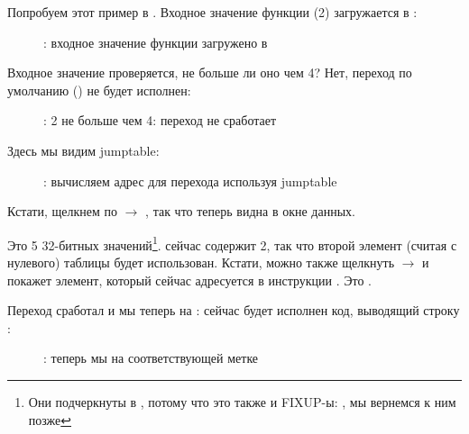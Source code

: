 ﻿\clearpage
\mysubparagraph{\olly}
\myindex{\olly}

Попробуем этот пример в \olly.
Входное значение функции (2) загружается в \EAX: 

\begin{figure}[H]
\centering
{}
\caption{\olly: входное значение функции загружено в \EAX}
\label{fig:switch_lot_olly1}
\end{figure}

\clearpage
Входное значение проверяется, не больше ли оно чем 4? 
Нет, переход по умолчанию () не будет исполнен:

\begin{figure}[H]
\centering
{}
\caption{\olly: 2 не больше чем 4: переход не сработает}
\label{fig:switch_lot_olly2}
\end{figure}

\clearpage
Здесь мы видим jumptable:

\begin{figure}[H]
\centering
{}
\caption{\olly: вычисляем адрес для перехода используя jumptable}
\label{fig:switch_lot_olly3}
\end{figure}

Кстати, щелкнем по  $\rightarrow$ , так что теперь  видна в окне данных.

Это 5 32-битных значений\footnote{Они подчеркнуты в \olly, потому что это также и FIXUP-ы: , мы вернемся к ним позже}.
\ECX сейчас содержит 2, так что второй элемент (считая с нулевого) таблицы будет использован.
Кстати, можно также щелкнуть  $\rightarrow$  и \olly покажет элемент, который сейчас адресуется в инструкции \JMP. 
Это .

\clearpage
Переход сработал и мы теперь на : сейчас будет исполнен код, выводящий строку :

\begin{figure}[H]
\centering
{}
\caption{\olly: теперь мы на соответствующей метке }
\label{fig:switch_lot_olly4}
\end{figure}
